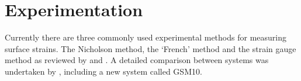 \section{Experimentation}
Currently there are three commonly used experimental methods for measuring
surface strains. The Nicholson method, the `French' method and the strain
gauge method as reviewed by \cite{Murphy_2005} and \cite{yang2005measurement}. A detailed comparison between systems was undertaken by \cite{kamarudin2014new}, including a new system called GSM10.  